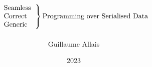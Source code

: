 \documentclass{beamer}
\title{
  \[
  \left.
    \begin{tabular}{l}
      Seamless \\
      Correct \\
      Generic
    \end{tabular}
  \right\}
  \text{Programming over Serialised Data}
  \]}
\author{Guillaume Allais}
\institute{University of Strathclyde \\ Glasgow, UK}
\date{2023}
\begin{document}
\begin{frame}
  \maketitle
\end{frame}






\end{document}
